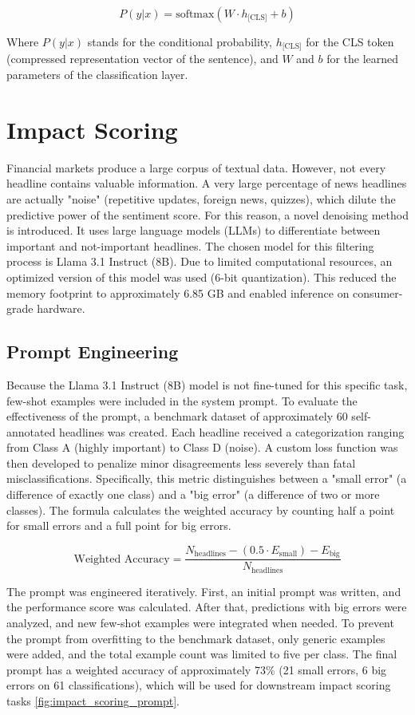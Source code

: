 \documentclass[Master,english,IEEE]{twbook}
\begin{document}
$$P(y|x) = \text{softmax}(W \cdot h_{\text{[CLS]}} + b)$$

Where $P(y|x)$ stands for the conditional probability, $h_{\text{[CLS]}}$ for the CLS token (compressed representation vector of the sentence), and $W$ and $b$ for the learned parameters of the classification layer.

\section{Impact Scoring}
Financial markets produce a large corpus of textual data. However, not every headline contains valuable information. A very large percentage of news headlines are actually "noise" (repetitive updates, foreign news, quizzes), which dilute the predictive power of the sentiment score. For this reason, a novel denoising method is introduced. It uses large language models (LLMs) to differentiate between important and not-important headlines. The chosen model for this filtering process is Llama 3.1 Instruct (8B). Due to limited computational resources, an optimized version of this model was used (6-bit quantization). This reduced the memory footprint to approximately 6.85 GB and enabled inference on consumer-grade hardware.

\subsection{Prompt Engineering}
Because the Llama 3.1 Instruct (8B) model is not fine-tuned for this specific task, few-shot examples were included in the system prompt. To evaluate the effectiveness of the prompt, a benchmark dataset of approximately 60 self-annotated headlines was created. Each headline received a categorization ranging from Class A (highly important) to Class D (noise). A custom loss function was then developed to penalize minor disagreements less severely than fatal misclassifications. Specifically, this metric distinguishes between a "small error" (a difference of exactly one class) and a "big error" (a difference of two or more classes). The formula calculates the weighted accuracy by counting half a point for small errors and a full point for big errors.

\vspace{0.2cm}
$$\text{Weighted Accuracy} = \frac{N_{\text{headlines}} - (0.5 \cdot E_{\text{small}}) - E_{\text{big}}}{N_{\text{headlines}}}$$
\vspace{0.2cm}

The prompt was engineered iteratively. First, an initial prompt was written, and the performance score was calculated. After that, predictions with big errors were analyzed, and new few-shot examples were integrated when needed. To prevent the prompt from overfitting to the benchmark dataset, only generic examples were added, and the total example count was limited to five per class. The final prompt has a weighted accuracy of approximately 73\% (21 small errors, 6 big errors on 61 classifications), which will be used for downstream impact scoring tasks \ref{fig:impact_scoring_prompt}.
\end{document}
